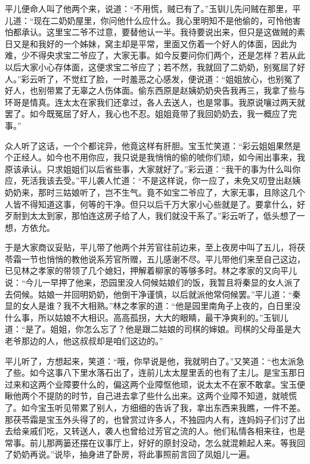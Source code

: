 平儿便命人叫了他两个来，说道：“不用慌，贼已有了。”玉钏儿先问贼在那里，平儿道：“现在二奶奶屋里，你问他什么应什么。我心里明知不是他偷的，可怜他害怕都承认。这里宝二爷不过意，要替他认一半。我待要说出来，但只是这做贼的素日又是和我好的一个姊妹，窝主却是平常，里面又伤着一个好人的体面，因此为难，少不得央求宝二爷应了，大家无事。如今反要问你们两个，还是怎样？若从此以后大家小心存体面，这便求宝二爷应了；若不然，我就回了二奶奶，别冤屈了好人。”彩云听了，不觉红了脸，一时羞恶之心感发，便说道：“姐姐放心，也别冤了好人，也别带累了无辜之人伤体面。偷东西原是赵姨奶奶央告我再三，我拿了些与环哥是情真。连太太在家我们还拿过，各人去送人，也是常事。我原说嚷过两天就罢了。如今既冤屈了好人，我心也不忍。姐姐竟带了我回奶奶去，我一概应了完事。”

众人听了这话，一个个都诧异，他竟这样有肝胆。宝玉忙笑道：“彩云姐姐果然是个正经人。如今也不用你应，我只说是我悄悄的偷的唬你们顽，如今闹出事来，我原该承认。只求姐姐们以后省些事，大家就好了。”彩云道：“我干的事为什么叫你应，死活我该去受。”平儿袭人忙道：“不是这样说，你一应了，未免又叨登出赵姨奶奶来，那时三姑娘听了，岂不生气。竟不如宝二爷应了，大家无事，且除这几个人皆不得知道这事，何等的干净。但只以后千万大家小心些就是了。要拿什么，好歹耐到太太到家，那怕连这房子给了人，我们就没干系了。”彩云听了，低头想了一想，方依允。

于是大家商议妥贴，平儿带了他两个并芳官往前边来，至上夜房中叫了五儿，将茯苓霜一节也悄悄的教他说系芳官所赠，五儿感谢不尽。平儿带他们来至自己这边，已见林之孝家的带领了几个媳妇，押解着柳家的等够多时。林之孝家的又向平儿说：“今儿一早押了他来，恐园里没人伺候姑娘们的饭，我暂且将秦显的女人派了去伺候。姑娘一并回明奶奶，他倒干净谨慎，以后就派他常伺候罢。”平儿道：“秦显的女人是谁？我不大相熟。”林之孝家的道：“他是园里南角子上夜的，白日里没什么事，所以姑娘不大相识。高高孤拐，大大的眼睛，最干净爽利的。”玉钏儿道：“是了。姐姐，你怎么忘了？他是跟二姑娘的司棋的婶娘。司棋的父母虽是大老爷那边的人，他这叔叔却是咱们这边的。”

平儿听了，方想起来，笑道：“哦，你早说是他，我就明白了。”又笑道：“也太派急了些。如今这事八下里水落石出了，连前儿太太屋里丢的也有了主儿。是宝玉那日过来和这两个业障要什么的，偏这两个业障怄他顽，说太太不在家不敢拿。宝玉便瞅他两个不提防的时节，自己进去拿了些什么出来。这两个业障不知道，就唬慌了。如今宝玉听见带累了别人，方细细的告诉了我，拿出东西来我瞧，一件不差。那茯苓霜是宝玉外头得了的，也曾赏过许多人，不独园内人有，连妈妈子们讨了出去给亲戚们吃，又转送人，袭人也曾给过芳官之流的人。他们私情各相来往，也是常事。前儿那两篓还摆在议事厅上，好好的原封没动，怎么就混赖起人来。等我回了奶奶再说。”说毕，抽身进了卧房，将此事照前言回了凤姐儿一遍。


